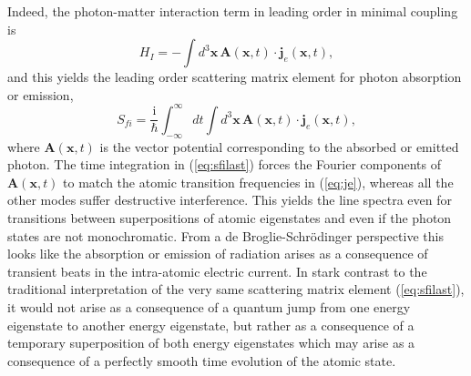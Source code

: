 \documentclass[final,3p,times,twocolumn]{elsarticle3}
\begin{document}
Indeed, the photon-matter interaction term in leading order in minimal coupling is
\begin{equation}\label{eq:H1b}
H_I=-\int\!d^3\bm{x}\,\bm{A}(\bm{x},t)\cdot\bm{j}_e(\bm{x},t),
\end{equation}
and this yields the leading order scattering matrix element for
photon absorption or emission,
\begin{equation}\label{eq:sfilast}
S_{\!fi}=\frac{\mathrm{i}}{\hbar}\int_{-\infty}^\infty\!dt
\int\!d^3\bm{x}\,\bm{A}(\bm{x},t)\cdot\bm{j}_e(\bm{x},t),
\end{equation}
where $\bm{A}(\bm{x},t)$ is the vector potential corresponding to the absorbed or 
emitted photon. The time integration in (\ref{eq:sfilast}) forces the Fourier 
components of $\bm{A}(\bm{x},t)$ to match the atomic 
transition frequencies in (\ref{eq:je}), whereas all the 
other modes suffer destructive interference. This yields the line spectra 
even for transitions between superpositions of atomic eigenstates and even if 
the photon states are not monochromatic. From a de Broglie-Schr\"odinger perspective
this looks like the absorption or emission of radiation arises as a consequence
of transient beats in the intra-atomic electric current. In stark contrast to the
traditional interpretation of the very same scattering matrix element (\ref{eq:sfilast}),
it would not arise as a consequence of a quantum jump from one energy eigenstate
to another energy eigenstate, but rather as a consequence of a temporary superposition
of both energy eigenstates which may arise as a consequence of a perfectly smooth
time evolution of the atomic state.
\end{document}
